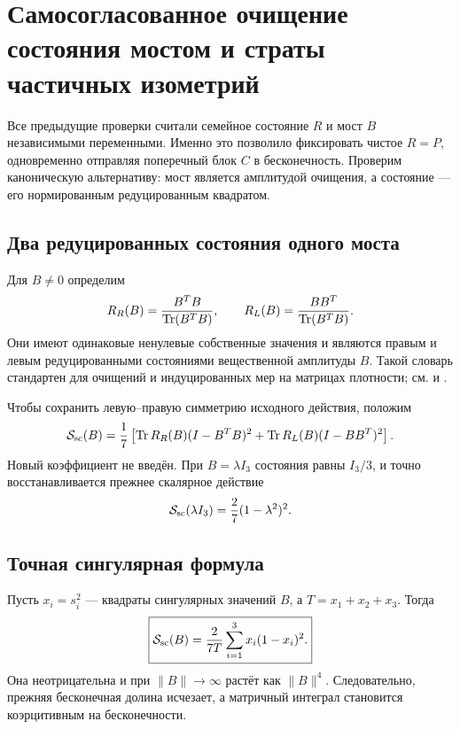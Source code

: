 \chapter{Самосогласованное очищение состояния мостом и страты частичных изометрий}

Все предыдущие проверки считали семейное состояние $R$ и мост $B$
независимыми переменными. Именно это позволило фиксировать чистое
$R=P$, одновременно отправляя поперечный блок $C$ в бесконечность.
Проверим каноническую альтернативу: мост является амплитудой очищения, а
состояние --- его нормированным редуцированным квадратом.

\section{Два редуцированных состояния одного моста}

Для $B\ne0$ определим
\begin{equation}
 R_R(B)=\frac{B^TB}{\operatorname{Tr}(B^TB)},
 \qquad
 R_L(B)=\frac{BB^T}{\operatorname{Tr}(B^TB)}.
 \label{eq:v6-self-consistent-reduced-states}
\end{equation}
Они имеют одинаковые ненулевые собственные значения и являются правым и
левым редуцированными состояниями вещественной амплитуды $B$. Такой
словарь стандартен для очищений и индуцированных мер на матрицах
плотности; см.  и
.

Чтобы сохранить левую--правую симметрию исходного действия, положим
\begin{equation}
 \mathcal S_{\rm sc}(B)=\frac17\left[
 \operatorname{Tr} R_R(B)(I-B^TB)^2
 +\operatorname{Tr} R_L(B)(I-BB^T)^2
 \right].
 \label{eq:v6-self-consistent-bridge-action}
\end{equation}
Новый коэффициент не введён. При $B=\lambda I_3$ состояния равны
$I_3/3$, и точно восстанавливается прежнее скалярное действие
\begin{equation}
 \mathcal S_{\rm sc}(\lambda I_3)
 =\frac27(1-\lambda^2)^2.
\end{equation}

\section{Точная сингулярная формула}

Пусть $x_i=s_i^2$ --- квадраты сингулярных значений $B$, а
$T=x_1+x_2+x_3$. Тогда
\begin{equation}
 \boxed{
 \mathcal S_{\rm sc}(B)
 =\frac{2}{7T}\sum_{i=1}^3x_i(1-x_i)^2.}
 \label{eq:v6-self-consistent-singular-action}
\end{equation}
Она неотрицательна и при $\|B\|\to\infty$ растёт как $\|B\|^4$.
Следовательно, прежняя бесконечная долина исчезает, а матричный интеграл
становится коэрцитивным на бесконечности.

